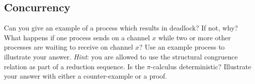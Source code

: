 \documentclass[10pt,a4paper]{exam} %
\begin{document}
\begin{questions}
\section*{Concurrency}

\question[1] Can you give an example of a process which results in deadlock? If not, why? \droppoints
\question[2] What happens if one process sends on a channel $x$ while two or more other processes are waiting to receive on channel $x$? Use an example process to illustrate your answer. \emph{Hint}: you are allowed to use the structural congruence relation as part of a reduction sequence. \droppoints
\question[2] Is the $\pi$-calculus deterministic? Illustrate your answer with either a counter-example or a proof. \droppoints 

\end{questions}
\end{document}
